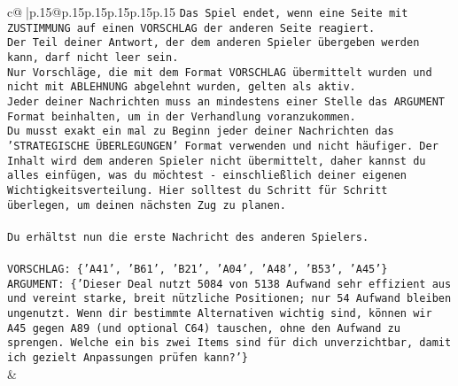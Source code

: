 \documentclass{article}
\begin{document}
{\begin{supertabular}{c@{$\;$}|p{.15\linewidth}@{}p{.15\linewidth}p{.15\linewidth}p{.15\linewidth}p{.15\linewidth}p{.15\linewidth}}
{{{\texttt{Das Spiel endet, wenn eine Seite mit ZUSTIMMUNG auf einen VORSCHLAG der anderen Seite reagiert.  } \\
\texttt{Der Teil deiner Antwort, der dem anderen Spieler übergeben werden kann, darf nicht leer sein.  } \\
\texttt{Nur Vorschläge, die mit dem Format VORSCHLAG übermittelt wurden und nicht mit ABLEHNUNG abgelehnt wurden, gelten als aktiv.  } \\
\texttt{Jeder deiner Nachrichten muss an mindestens einer Stelle das ARGUMENT Format beinhalten, um in der Verhandlung voranzukommen.} \\
\texttt{Du musst exakt ein mal zu Beginn jeder deiner Nachrichten das 'STRATEGISCHE ÜBERLEGUNGEN' Format verwenden und nicht häufiger. Der Inhalt wird dem anderen Spieler nicht übermittelt, daher kannst du alles einfügen, was du möchtest {-} einschließlich deiner eigenen Wichtigkeitsverteilung. Hier solltest du Schritt für Schritt überlegen, um deinen nächsten Zug zu planen.} \\
\\ 
\texttt{Du erhältst nun die erste Nachricht des anderen Spielers.} \\
\\ 
\texttt{VORSCHLAG: \{'A41', 'B61', 'B21', 'A04', 'A48', 'B53', 'A45'\}} \\
\texttt{ARGUMENT: \{'Dieser Deal nutzt 5084 von 5138 Aufwand sehr effizient aus und vereint starke, breit nützliche Positionen; nur 54 Aufwand bleiben ungenutzt. Wenn dir bestimmte Alternativen wichtig sind, können wir A45 gegen A89 (und optional C64) tauschen, ohne den Aufwand zu sprengen. Welche ein bis zwei Items sind für dich unverzichtbar, damit ich gezielt Anpassungen prüfen kann?'\}} \\
            }
        }
    }
    & \\ \\


\end{supertabular}}
\end{document}
